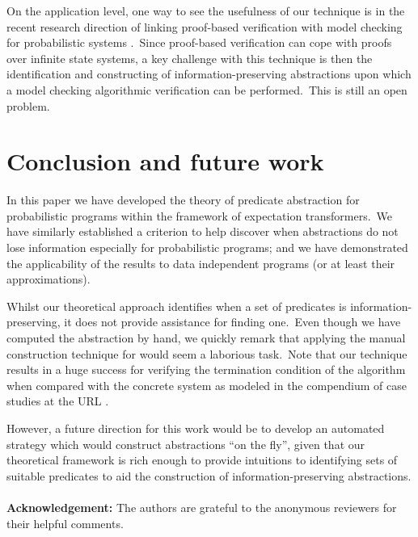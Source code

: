 \documentclass[numbers,copyright,creativecommons]{eptcs}
\begin{document}
On the application level, one way to see the usefulness of our technique is in the recent research direction of linking proof-based verification with model checking for probabilistic systems \cite{Ndukwu09, Ndukwu10}.\ Since proof-based verification can cope with proofs over infinite state systems, a key challenge with this technique is then the identification and constructing of information-preserving abstractions upon which a model checking algorithmic verification can be performed.\ This is still an open problem.

\section{Conclusion and future work}

In this paper we have developed the theory of predicate abstraction for probabilistic programs within the framework of expectation transformers.\ We have similarly established a criterion to help discover when abstractions do not lose information especially for probabilistic programs; and we have demonstrated the applicability of the results to data independent programs (or at least their approximations).

Whilst our theoretical approach identifies when a set of predicates is information-preserving, it does not provide assistance for finding one.\ Even though we have computed the abstraction by hand, we quickly remark that applying the manual construction technique for  would seem a laborious task.\ Note that our technique results in a huge success for verifying the termination condition of the algorithm when compared with the concrete system as modeled in the compendium of case studies at the URL \cite{PRISM}.

However, a future direction for this work would be to develop an automated strategy which would construct abstractions ``on the fly'', given that our theoretical framework is rich enough to provide intuitions to identifying sets of suitable predicates to aid the construction of information-preserving abstractions.\\\\
{\bf \noindent \large{Acknowledgement:}} The authors are grateful to the anonymous reviewers for their helpful comments.





\end{document}
